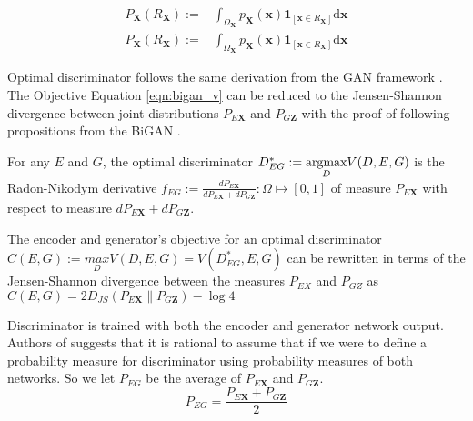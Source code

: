 \begin{align}
    P_{\mathbf{X}}\left(R_{\mathbf{X}}\right) :=&\int_{\Omega_{\mathbf{X}}} p_{\mathbf{X}}(\mathbf{x}) \mathbf{1}_{\left[\mathbf{x} \in R_{\mathbf{X}}\right]} \mathrm{d} \mathbf{x} \\[5pt]
    P_{\mathbf{X}}\left(R_{\mathbf{X}}\right) :=&\int_{\Omega_{\mathbf{X}}} p_{\mathbf{X}}(\mathbf{x}) \mathbf{1}_{\left[\mathbf{x} \in R_{\mathbf{X}}\right]} \mathrm{d} \mathbf{x}
\end{align}

Optimal discriminator follows the same derivation from the GAN framework
\cite{Goodfellow:2014:GAN:2969033.2969125}. The Objective Equation \ref{eqn:bigan_v} can be reduced
to the Jensen-Shannon divergence between joint distributions $P_{E\mathbf{X}}$ and $P_{G\mathbf{Z}}$
with the proof of following propositions from the BiGAN \cite{Donahue2017AdversarialFL}.

\begin{prop}
    \label{prop:bigan_1}
    For any $E$ and $G$, the optimal discriminator $D^*_{EG} := \\ \underset{D}{\text{argmax}}  V(D, E,
    G)$ is the Radon-Nikodym derivative $f_{EG} := \frac{dP_{E\mathbf{X}}}{dP_{E\mathbf{X}} +
    dP_{G\mathbf{Z}}}  : \Omega  \mapsto [0, 1]$ of measure $P_{E\mathbf{X}}$ with respect to measure
    $ dP_{E\mathbf{X}} + dP_{G\mathbf{Z}}$.
\end{prop}

\begin{prop}
    \label{prop:bigan_2}
  The encoder and generator's objective for an optimal discriminator $C(E, G):= \underset{D}{max}
  V(D, E, G) = V(D^*_{EG}, E, G)$ can be rewritten in terms of the Jensen-Shannon divergence between
  the measures $P_{EX}$ and $P_{GZ}$ as $C(E, G) = 2 D_{JS} (P_{E\mathbf{X}} \parallel P_{G\mathbf{Z}}) -
  \log 4$    
\end{prop}

Discriminator is trained with both the encoder and generator network output. Authors of \cite{Donahue2017AdversarialFL}
suggests that it is rational to assume that if we were to define a probability measure for discriminator using 
probability measures of both networks. So we let $P_{EG}$
be the average of $P_{E\mathbf{X}}$ and $P_{G\mathbf{Z}}$. 
\begin{equation}
  P_{EG} = \frac{P_{E\mathbf{X}} + P_{G\mathbf{Z}}}{2}  
\end{equation}


